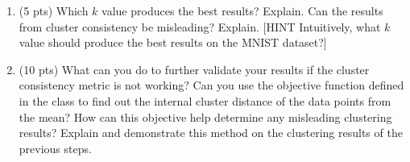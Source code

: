 \documentclass[10pt,letter,notitlepage]{article}
\newcommand{\blue}[1]{{\color{blue}#1}}
\newcounter{exercise}
\begin{document}
\begin{exercise}
\begin{enumerate}
   \item (5 pts) Which $k$ value produces the best results? Explain. Can the results from cluster consistency be misleading? Explain. [\blue{HINT} Intuitively, what $k$ value should produce the best results on the MNIST dataset?]
   \item (10 pts) What can you do to further validate your results if the cluster consistency metric is not working? Can you use the objective function defined in the class to find out the internal cluster distance of the data points from the mean? How can this objective help determine any misleading clustering results? Explain and demonstrate this method on the clustering results of the previous steps.  
   
\end{enumerate}
    
\end{exercise}
\end{document}
